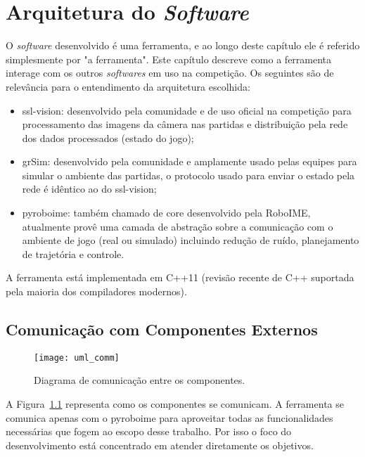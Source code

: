 \chapter{Arquitetura do \textit{Software}}\label{cap:arquitetura}

O \textit{software} desenvolvido é uma ferramenta, e ao longo deste capítulo ele
é referido simplesmente por "a ferramenta".  Este capítulo descreve como a
ferramenta interage com os outros \textit{softwares} em uso na competição.  Os
seguintes são de relevância para o entendimento da arquitetura escolhida:

\begin{itemize}
  \item ssl-vision: desenvolvido pela comunidade e de uso oficial na competição
    para processamento das imagens da câmera nas partidas e distribuição pela
    rede dos dados processados (estado do jogo);
  \item grSim: desenvolvido pela comunidade e amplamente usado pelas equipes
    para simular o ambiente das partidas, o protocolo usado para enviar o estado
    pela rede é idêntico ao do ssl-vision;
  \item pyroboime: também chamado de core desenvolvido pela RoboIME, atualmente
    provê uma camada de abstração sobre a comunicação com o ambiente de jogo
    (real ou simulado) incluindo redução de ruído, planejamento de trajetória e
    controle.
\end{itemize}


A ferramenta está implementada em C++11 (revisão recente de C++ suportada pela
maioria dos compiladores modernos).

\section{Comunicação com Componentes Externos}

\begin{figure}[H]
  \centering
  \texttt{[image: uml\_comm]}
  \caption{Diagrama de comunicação entre os componentes.}\label{fig:arch_comm}
\end{figure}

A Figura~\ref{fig:arch_comm} representa como os componentes se comunicam.  A
ferramenta se comunica apenas com o pyroboime para aproveitar todas as
funcionalidades necessárias que fogem ao escopo desse trabalho.  Por isso o foco
do desenvolvimento está concentrado em atender diretamente os objetivos.

